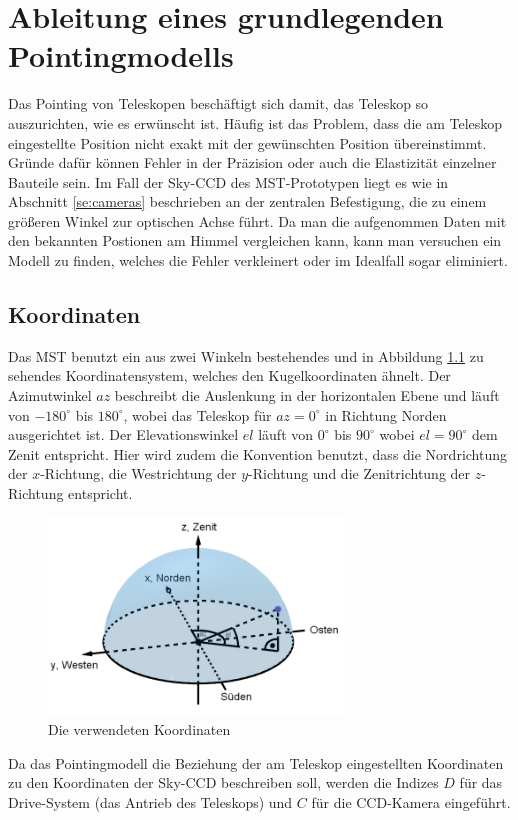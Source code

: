 \chapter{Ableitung eines grundlegenden Pointingmodells}
\label{ch:pointing}
Das Pointing von Teleskopen beschäftigt sich damit, das Teleskop so auszurichten, wie es erwünscht ist. Häufig ist das Problem, dass die am Teleskop eingestellte Position nicht exakt mit der gewünschten Position übereinstimmt. Gründe dafür können Fehler in der Präzision oder auch die Elastizität einzelner Bauteile sein. Im Fall der Sky-CCD des MST-Prototypen liegt es wie in Abschnitt \ref{se:cameras} beschrieben an der zentralen Befestigung, die zu einem größeren Winkel zur optischen Achse führt. Da man die aufgenommen Daten mit den bekannten Postionen am Himmel vergleichen kann, kann man versuchen ein Modell zu finden, welches die Fehler verkleinert oder im Idealfall sogar eliminiert.

\section{Koordinaten}
Das MST benutzt ein aus zwei Winkeln bestehendes und in Abbildung \ref{img:coordinates} zu sehendes Koordinatensystem, welches den Kugelkoordinaten ähnelt. Der Azimutwinkel $az$ beschreibt die Auslenkung in der horizontalen Ebene und läuft von $-180^{\circ}$ bis $180^{\circ}$, wobei das Teleskop für $az=0^{\circ}$ in Richtung Norden ausgerichtet ist. Der Elevationswinkel $el$ läuft von $0^{\circ}$ bis $90^{\circ}$ wobei $el=90^{\circ}$ dem Zenit entspricht. Hier wird zudem die Konvention benutzt, dass die Nordrichtung der $x$-Richtung, die Westrichtung der $y$-Richtung und die Zenitrichtung der $z$-Richtung entspricht.
\begin{figure}[htbp]
\centering
\includegraphics[width=0.7\textwidth]{Images/coordinates.png}
\caption{Die verwendeten Koordinaten}
\label{img:coordinates}
\end{figure}
Da das Pointingmodell die Beziehung der am Teleskop eingestellten Koordinaten zu den Koordinaten der Sky-CCD beschreiben soll, werden die Indizes $D$ für das Drive-System (das Antrieb des Teleskops) und $C$ für die CCD-Kamera eingeführt.

